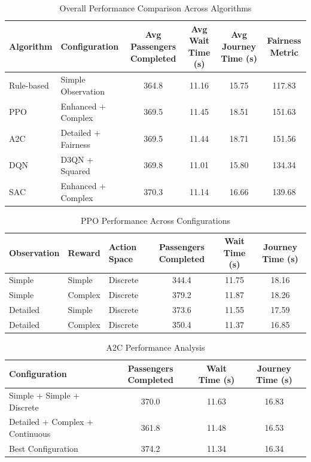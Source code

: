 \documentclass[10pt,twocolumn]{article}
\begin{document}
\begin{table}[h!]
\centering
\setlength{\tabcolsep}{4pt}
\caption{Overall Performance Comparison Across Algorithms}
\label{tab:overall-performance}
\begin{tabular}{l l c c c c}
\hline
Algorithm & Configuration & Avg Passengers Completed & Avg Wait Time (s) & Avg Journey Time (s) & Fairness Metric \\
\hline
Rule-based & Simple Observation & 364.8 & 11.16 & 15.75 & 117.83 \\
PPO & Enhanced + Complex & 369.5 & 11.45 & 18.51 & 151.63 \\
A2C & Detailed + Fairness & 369.5 & 11.44 & 18.71 & 151.56 \\
DQN & D3QN + Squared & 369.8 & 11.01 & 15.80 & 134.34 \\
SAC & Enhanced + Complex & 370.3 & 11.14 & 16.66 & 139.68 \\
\hline
\end{tabular}
\end{table}

\begin{table}[h!]
\centering
\caption{PPO Performance Across Configurations}
\label{tab:ppo-performance}
\begin{tabular}{l l l c c c}
\hline
Observation & Reward & Action Space & Passengers Completed & Wait Time (s) & Journey Time (s) \\
\hline
Simple & Simple & Discrete & 344.4 & 11.75 & 18.16 \\
Simple & Complex & Discrete & 379.2 & 11.87 & 18.26 \\
Detailed & Simple & Discrete & 373.6 & 11.55 & 17.59 \\
Detailed & Complex & Discrete & 350.4 & 11.37 & 16.85 \\
\hline
\end{tabular}
\end{table}

\begin{table}[h!]
\centering
\caption{A2C Performance Analysis}
\label{tab:a2c-performance}
\begin{tabular}{l c c c}
\hline
Configuration & Passengers Completed & Wait Time (s) & Journey Time (s) \\
\hline
Simple + Simple + Discrete & 370.0 & 11.63 & 16.83 \\
Detailed + Complex + Continuous & 361.8 & 11.48 & 16.53 \\
Best Configuration & 374.2 & 11.34 & 16.34 \\
\hline
\end{tabular}
\end{table}
\end{document}
